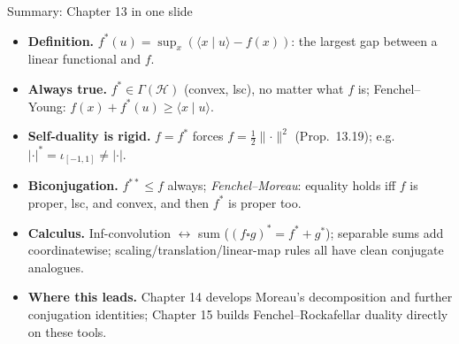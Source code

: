 \documentclass[aspectratio=169,10pt]{beamer}
\newcommand{\Hil}{\mathcal{H}}
\newcommand{\inner}[2]{\langle #1 \mid #2 \rangle}
\newcommand{\norm}[1]{\lVert #1 \rVert}
\newcommand{\conj}[1]{#1^{*}}
\newcommand{\biconj}[1]{#1^{**}}
\begin{document}
\begin{frame}{Summary: Chapter 13 in one slide}
  \begin{itemize}
    \item \textbf{Definition.} $\conj f(u) = \sup_{x}(\inner xu - f(x))$:
      the largest gap between a linear functional and $f$.
    \item \textbf{Always true.} $\conj f\in\Gamma(\Hil)$ (convex, lsc), no
      matter what $f$ is; Fenchel--Young: $f(x)+\conj f(u)\ge\inner xu$.
    \item \textbf{Self-duality is rigid.} $f=\conj f$ forces
      $f=\tfrac12\norm\cdot^2$ (Prop.\ 13.19); e.g.\ $\conj{|\cdot|} =
      \iota_{[-1,1]} \ne |\cdot|$.
    \item \textbf{Biconjugation.} $\biconj f\le f$ always;
      \emph{Fenchel--Moreau}: equality holds iff $f$ is proper, lsc, and
      convex, and then $\conj f$ is proper too.
    \item \textbf{Calculus.} Inf-convolution $\leftrightarrow$ sum
      ($(f\square g)^{*}=\conj f+\conj g$); separable sums add
      coordinatewise; scaling/translation/linear-map rules all have clean
      conjugate analogues.
    \item \textbf{Where this leads.} Chapter 14 develops Moreau's
      decomposition and further conjugation identities; Chapter 15 builds
      Fenchel--Rockafellar duality directly on these tools.
  \end{itemize}
\end{frame}
\end{document}
